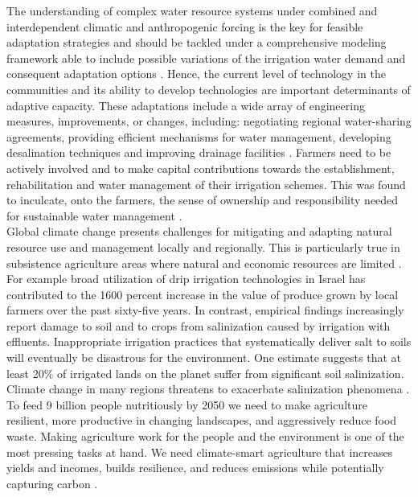 \documentclass[letterpaper, 10 pt, conference]{ieeeconf}  %
\begin{document}
The understanding of complex water resource systems under combined and interdependent climatic and anthropogenic forcing is the key for feasible adaptation strategies and should be tackled under a comprehensive modeling framework able to include possible variations of the irrigation water demand and consequent adaptation options \cite{Guyennon2016}. Hence, the current level of technology in the communities and its ability to develop technologies are important determinants of adaptive capacity. These adaptations include a wide array of engineering measures, improvements, or changes, including: negotiating regional water-sharing agreements, providing efficient mechanisms for water management, developing desalination techniques and improving drainage facilities \cite{smit2003adaptation}. Farmers need to be actively involved and to make capital contributions towards the establishment, rehabilitation and water management of their irrigation schemes. This was found to inculcate, onto the farmers, the sense of ownership and responsibility needed for sustainable water management \cite{mutambara2016comparative}.\\

Global climate change presents challenges for mitigating and adapting natural resource use and management locally and regionally. This is particularly true in subsistence agriculture areas where natural and economic resources are limited \cite{thenkabail2011improving}. For example broad utilization of drip irrigation technologies in Israel has contributed to the 1600 percent increase in the value of produce grown by local farmers over the past sixty-five years. In contrast, empirical findings increasingly report damage to soil and to crops from salinization caused by irrigation with effluents. Inappropriate irrigation practices that systematically deliver salt to soils will eventually be disastrous for the environment. One estimate suggests that at least 20\% of irrigated lands on the planet suffer from significant soil salinization. Climate change in many regions threatens to exacerbate salinization phenomena \cite{tal2016rethinking}.\\

To feed 9 billion people nutritiously by 2050 we need to make agriculture resilient, more productive in changing landscapes, and aggressively reduce food waste. Making agriculture work for the people and the environment is one of the most pressing tasks at hand. We need climate-smart agriculture that increases yields and incomes, builds resilience, and reduces emissions while potentially capturing carbon \cite{Kyte2014cambio}.\\
\end{document}
